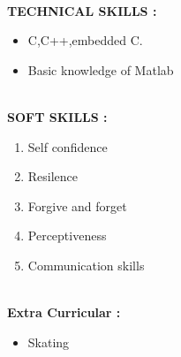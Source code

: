 \documentclass{article}
\begin{document}
	
		
\leavevmode\\
	\textbf{TECHNICAL SKILLS :}
	\begin{itemize}	
		\item C,C++,embedded C.
		\item Basic knowledge of Matlab 
	\end{itemize}
		\newpage
		
\leavevmode		\\	
	\textbf{SOFT SKILLS :}
	\begin{enumerate}
	\item Self confidence 
	\item Resilence
	\item Forgive and forget
	\item Perceptiveness
	\item Communication skills 

	\end{enumerate}
	
\leavevmode\\
	\textbf{Extra Curricular :}
	\begin{itemize}
		\item Skating
		
	\end{itemize}
\end{document}
